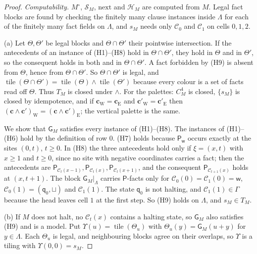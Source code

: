 \begin{proof}
\emph{Computability.} $M^\circ$, $\mathcal S_M$, $\mathrm{next}$ and $\mathcal H_M$ are computed from $M$. Legal fact blocks are found by checking the finitely many clause instances inside $\Lambda$ for each of the finitely many fact fields on $\Lambda$, and $s_M$ needs only $\mathcal C_0$ and $\mathcal C_1$ on cells $0,1,2$.

(a) Let $\Theta,\Theta'$ be legal blocks and $\Theta\cap\Theta'$ their pointwise intersection. If the antecedents of an instance of (H1)--(H8) hold in $\Theta\cap\Theta'$, they hold in $\Theta$ and in $\Theta'$, so the consequent holds in both and in $\Theta\cap\Theta'$. A fact forbidden by (H9) is absent from $\Theta$, hence from $\Theta\cap\Theta'$. So $\Theta\cap\Theta'$ is legal, and $\operatorname{tile}(\Theta\cap\Theta')=\operatorname{tile}(\Theta)\wedge\operatorname{tile}(\Theta')$ because every colour is a set of facts read off $\Theta$. Thus $T_M$ is closed under $\wedge$. For the palettes: $C_M^4$ is closed, $\{s_M\}$ is closed by idempotence, and if $\mathbf c_{\mathrm W}=\mathbf c_{\mathrm E}$ and $\mathbf c'_{\mathrm W}=\mathbf c'_{\mathrm E}$ then $(\mathbf c\wedge\mathbf c')_{\mathrm W}=(\mathbf c\wedge\mathbf c')_{\mathrm E}$; the vertical palette is the same.

We show that $\mathsf G_M$ satisfies every instance of (H1)--(H8). The instances of (H1)--(H6) hold by the definition of row $0$. (H7) holds because $\mathsf P_{\mathsf w}$ occurs exactly at the sites $(0,t)$, $t\ge0$. In (H8) the three antecedents hold only if $\xi=(x,t)$ with $x\ge1$ and $t\ge0$, since no site with negative coordinates carries a fact; then the antecedents are $\mathsf P_{\mathcal C_t(x-1)},\mathsf P_{\mathcal C_t(x)},\mathsf P_{\mathcal C_t(x+1)}$, and the consequent $\mathsf P_{\mathcal C_{t+1}(x)}$ holds at $(x,t+1)$. The block $\mathsf G_M|_\Lambda$ carries $\mathsf P$-facts only for $\mathcal C_0(0)=\mathcal C_1(0)=\mathsf w$, $\mathcal C_0(1)=(\mathsf q_0,\sqcup)$ and $\mathcal C_1(1)$. The state $\mathsf q_0$ is not halting, and $\mathcal C_1(1)\in\Gamma$ because the head leaves cell $1$ at the first step. So (H9) holds on $\Lambda$, and $s_M\in T_M$.

(b) If $M$ does not halt, no $\mathcal C_t(x)$ contains a halting state, so $\mathsf G_M$ also satisfies (H9) and is a model. Put $\Upsilon(u)=\operatorname{tile}(\Theta_u)$ with $\Theta_u(y)=\mathsf G_M(u+y)$ for $y\in\Lambda$. Each $\Theta_u$ is legal, and neighbouring blocks agree on their overlaps, so $\Upsilon$ is a tiling with $\Upsilon(0,0)=s_M$.


\end{proof}
